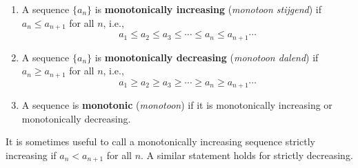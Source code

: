\begin{definition}\label{def:monotonic}
\begin{enumerate}
\item		A sequence $\{a_n\}$ is \textbf{monotonically increasing} (\textit{monotoon stijgend}) if $a_n \leq a_{n+1}$ for all $n$, i.e.,
 $$a_1 \leq a_2 \leq a_3 \leq \cdots\leq a_n \leq a_{n+1} \cdots$$
 \item	A sequence $\{a_n\}$ is \textbf{monotonically decreasing} (\textit{monotoon dalend}) if $a_n \geq a_{n+1}$ for all $n$, i.e.,
 $$a_1 \geq a_2 \geq a_3 \geq \cdots \geq a_n \geq a_{n+1} \cdots$$
 \item	A sequence is \textbf{monotonic} (\textit{monotoon}) if it is monotonically increasing or monotonically decreasing.
 \end{enumerate}
\end{definition}


It is sometimes useful to call a monotonically increasing sequence strictly increasing if $a_n < a_{n+1}$ for all $n$. A similar statement holds for strictly decreasing.


